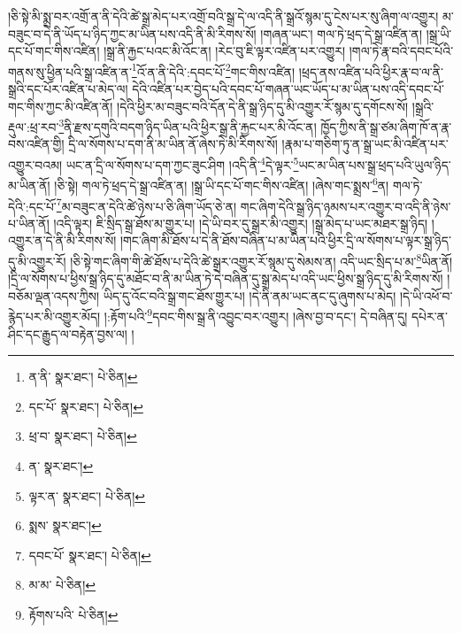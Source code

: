 །ཅི་སྟེ་མི་སྨྲ་བར་འགྲོ་ན་ནི་དེའི་ཚེ་སྒྲ་མེད་པར་འགྲོ་བའི་སྒྲ་དེ་ལ་འདི་ནི་སྒྲའོ་སྙམ་དུ་ངེས་པར་སུ་ཞིག་ལ་འགྱུར། མ་བཟུང་བ་དེ་ནི་ཡོད་པ་ཉིད་ཀྱང་མ་ཡིན་པས་འདི་ནི་མི་རིགས་སོ། །གཞན་ཡང་། གལ་ཏེ་ཕྲད་དེ་སྒྲ་འཛིན་ན། །སྒྲ་ཡི་དང་པོ་གང་གིས་འཛིན། །སྒྲ་ནི་རྐྱང་པའང་མི་འོང་ན། །རེང་བུ་ཇི་ལྟར་འཛིན་པར་འགྱུར། །གལ་ཏེ་རྣ་བའི་དབང་པོའི་གནས་སུ་ཕྱིན་པའི་སྒྲ་འཛིན་ན་\footnote{ན་ནི་  སྣར་ཐང་།  པེ་ཅིན། }འོ་ན་ནི་དེའི་:དབང་པོ་\footnote{དང་པོ་  སྣར་ཐང་།  པེ་ཅིན། }གང་གིས་འཛིན། །ཕྲད་ནས་འཛིན་པའི་ཕྱིར་རྣ་བ་ལ་ནི་སྒྲའི་དང་པོར་འཛིན་པ་མེད་ལ། དེའི་འཛིན་པར་བྱེད་པའི་དབང་པོ་གཞན་ཡང་ཡོད་པ་མ་ཡིན་པས་འདི་དབང་པོ་གང་གིས་ཀྱང་མི་འཛིན་ནོ། །དེའི་ཕྱིར་མ་བཟུང་བའི་དོན་དེ་ནི་སྒྲ་ཉིད་དུ་མི་འགྱུར་རོ་སྙམ་དུ་དགོངས་སོ། །སྒྲའི་རྡུལ་:ཕྲ་རབ་\footnote{ཕྲ་བ་  སྣར་ཐང་།  པེ་ཅིན། }ནི་རྫས་དགུའི་བདག་ཉིད་ཡིན་པའི་ཕྱིར་སྒྲ་ནི་རྐྱང་པར་མི་འོང་ན། ཁྱོད་ཀྱིས་ནི་སྒྲ་ཙམ་ཞིག་ཁོ་ན་རྣ་བས་འཛིན་གྱི། དྲི་ལ་སོགས་པ་དག་ནི་མ་ཡིན་ནོ་ཞེས་ཏེ་མི་རིགས་སོ། །རྣམ་པ་གཅིག་ཏུ་ན་སྒྲ་ཡང་མི་འཛིན་པར་འགྱུར་བའམ། ཡང་ན་དྲི་ལ་སོགས་པ་དག་ཀྱང་ཟུང་ཤིག །འདི་ནི་\footnote{ན་  སྣར་ཐང་། }དེ་ལྟར་\footnote{ལྟར་ན་  སྣར་ཐང་།  པེ་ཅིན། }ཡང་མ་ཡིན་པས་སྒྲ་ཕྲད་པའི་ཡུལ་ཉིད་མ་ཡིན་ནོ། །ཅི་སྟེ། གལ་ཏེ་ཕྲད་དེ་སྒྲ་འཛིན་ན། །སྒྲ་ཡི་དང་པོ་གང་གིས་འཛིན། །ཞེས་གང་སྨྲས་\footnote{སྨས་  སྣར་ཐང་། }ན། གལ་ཏེ་དེའི་:དང་པོ་\footnote{དབང་པོ་  སྣར་ཐང་།  པེ་ཅིན། }མ་བཟུང་ན་དེའི་ཚེ་ཉེས་པ་ཅི་ཞིག་ཡོད་ཅེ་ན། གང་ཞིག་དེའི་སྒྲ་ཉིད་ཉམས་པར་འགྱུར་བ་འདི་ནི་ཉེས་པ་ཡིན་ནོ། །འདི་ལྟར། ཇི་སྲིད་སྒྲ་ཐོས་མ་གྱུར་པ། །དེ་ཡི་བར་དུ་སྒྲར་མི་འགྱུར། །སྒྲ་མེད་པ་ཡང་མཐར་སྒྲ་ཉིད། །འགྱུར་ན་དེ་ནི་མི་རིགས་སོ། །གང་ཞིག་མི་ཐོས་པ་དེ་ནི་ཐོས་བཞིན་པ་མ་ཡིན་པའི་ཕྱིར་དྲི་ལ་སོགས་པ་ལྟར་སྒྲ་ཉིད་དུ་མི་འགྱུར་རོ། །ཅི་སྟེ་གང་ཞིག་གི་ཚེ་ཐོས་པ་དེའི་ཚེ་སྒྲར་འགྱུར་རོ་སྙམ་དུ་སེམས་ན། འདི་ཡང་སྲིད་པ་མ་\footnote{མ་མ་  པེ་ཅིན། }ཡིན་ནོ། །དྲི་ལ་སོགས་པ་ཕྱིས་སྒྲ་ཉིད་དུ་མཐོང་བ་ནི་མ་ཡིན་ཏེ་དེ་བཞིན་དུ་སྒྲ་མེད་པ་འདི་ཡང་ཕྱིས་སྒྲ་ཉིད་དུ་མི་རིགས་སོ། །བཅོམ་ལྡན་འདས་ཀྱིས། ཡིད་དུ་འོང་བའི་སྒྲ་གང་ཐོས་གྱུར་པ། །དེ་ནི་ནམ་ཡང་ནང་དུ་ཞུགས་པ་མེད། །དེ་ཡི་འཕོ་བ་རྙེད་པར་མི་འགྱུར་མོད། །:རྟོག་པའི་\footnote{རྟོགས་པའི་  པེ་ཅིན། }དབང་གིས་སྒྲ་ནི་འབྱུང་བར་འགྱུར། །ཞེས་བྱ་བ་དང་། དེ་བཞིན་དུ། དཔེར་ན་ཤིང་དང་རྒྱུད་ལ་བརྟེན་བྱས་ལ། །
